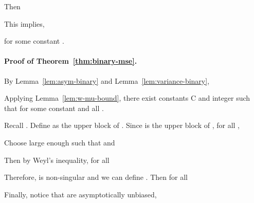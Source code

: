 \documentclass[11pt,a4paper]{article}
\begin{document}
Then

This implies, 

for some constant . 


\paragraph{Proof of Theorem~\ref{thm:binary-mse}.} By Lemma~\ref{lem:asym-binary} and Lemma~\ref{lem:variance-binary}, 


Applying Lemma~\ref{lem:w-mu-bound}, there exist constants C and integer  such that for some constant  and all .

Recall . Define  as the upper  block of . Since  is the upper  block of , for all ,

Choose  large enough such that  and 

Then by Weyl's inequality, for all 

Therefore,  is non-singular and we can define . Then for all 


Finally, notice that  are asymptotically unbiased, 
 

\clearpage{}
\end{document}
